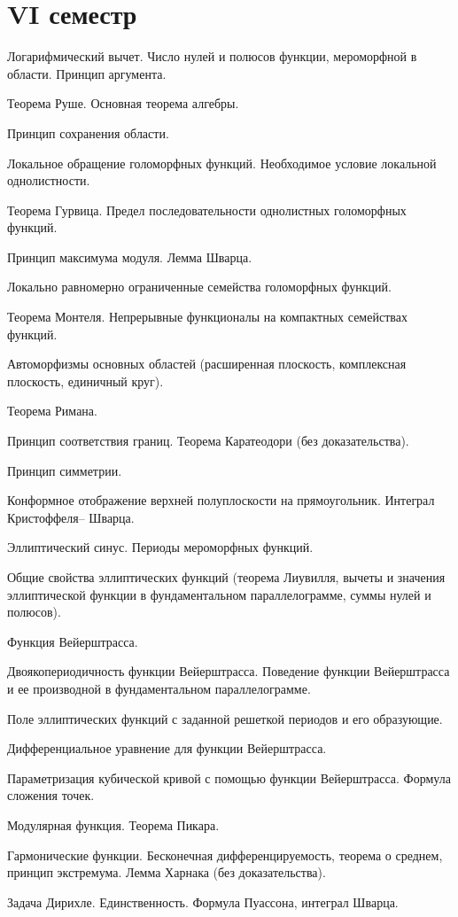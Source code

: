 \documentclass[a4paper]{article}
\begin{document}
\section*{VI семестр}
\begin{nums}{-2}
\item Логарифмический вычет. Число нулей и полюсов функции, мероморфной в
области. Принцип аргумента.
\item Теорема Руше. Основная теорема алгебры.
\item Принцип сохранения области.
\item Локальное обращение голоморфных функций. Необходимое условие локальной
однолистности.
\item Теорема Гурвица. Предел последовательности однолистных голоморфных
функций.
\item Принцип максимума модуля. Лемма Шварца.
\item Локально равномерно ограниченные семейства голоморфных функций.
\item Теорема Монтеля. Непрерывные функционалы на компактных семействах
функций.
\item Автоморфизмы основных областей (расширенная плоскость, комплексная
плоскость, единичный круг).
\item Теорема Римана.
\item Принцип соответствия границ. Теорема Каратеодори (без доказательства).
\item Принцип симметрии.
\item Конформное отображение верхней полуплоскости на прямоугольник. Интеграл
Кристоффеля-- Шварца.
\item Эллиптический синус. Периоды мероморфных функций.
\item Общие свойства эллиптических функций (теорема Лиувилля, вычеты и
значения эллиптической функции в фундаментальном параллелограмме, суммы
нулей и полюсов).
\item Функция Вейерштрасса.
\item Двоякопериодичность функции Вейерштрасса. Поведение функции Вейерштрасса
и ее производной в фундаментальном параллелограмме.
\item Поле эллиптических функций с заданной решеткой периодов и его
образующие.
\item Дифференциальное уравнение для функции Вейерштрасса.
\item Параметризация кубической кривой с помощью функции Вейерштрасса. Формула
сложения точек.
\item Модулярная функция. Теорема Пикара.
\item Гармонические функции. Бесконечная дифференцируемость, теорема о
среднем, принцип экстремума. Лемма Харнака (без доказательства).
\item Задача Дирихле. Единственность. Формула Пуассона, интеграл Шварца.
\end{nums}

\medskip
\dmvntrail
\end{document}
